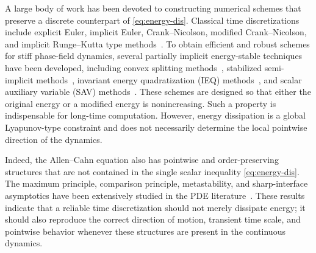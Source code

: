 \documentclass[final, 3p, times]{elsarticle}%
\begin{document}
A large body of work has been devoted to constructing numerical schemes that preserve a discrete counterpart of \eqref{eq:energy-dis}. Classical time discretizations include explicit Euler, implicit Euler, Crank--Nicolson, modified Crank--Nicolson, and implicit Runge--Kutta type methods~\cite{crank1947practical,jeong2016comparison,condette2011spectral,shen2010numerical,hou2017numerical,zhang2021numerical,zhang2021preserving}. To obtain efficient and robust schemes for stiff phase-field dynamics, several partially implicit energy-stable techniques have been developed, including convex splitting methods~\cite{eyre1998unconditionally,tangqiao2020phasefield,graser2013time,guan2014second,guillen2014second}, stabilized semi-implicit methods~\cite{xu2006stability,he2007large,feng2013stabilized,tangyang2016imex}, invariant energy quadratization (IEQ) methods~\cite{yang2016linear,yang2020convergence}, and scalar auxiliary variable (SAV) methods~\cite{shen2018scalar,shen2019new}. These schemes are designed so that either the original energy or a modified energy is nonincreasing. Such a property is indispensable for long-time computation. However, energy dissipation is a global Lyapunov-type constraint and does not necessarily determine the local pointwise direction of the dynamics.

Indeed, the Allen--Cahn equation also has pointwise and order-preserving structures that are not contained in the single scalar inequality \eqref{eq:energy-dis}. The maximum principle, comparison principle, metastability, and sharp-interface asymptotics have been extensively studied in the PDE literature~\cite{evans1992phase,pego1989front,ilmanen1993convergence,alikakos1994convergence,chen1994spectrum,chen1996global,caginalp1998convergence}. These results indicate that a reliable time discretization should not merely dissipate energy; it should also reproduce the correct direction of motion, transient time scale, and pointwise behavior whenever these structures are present in the continuous dynamics.
\end{document}
